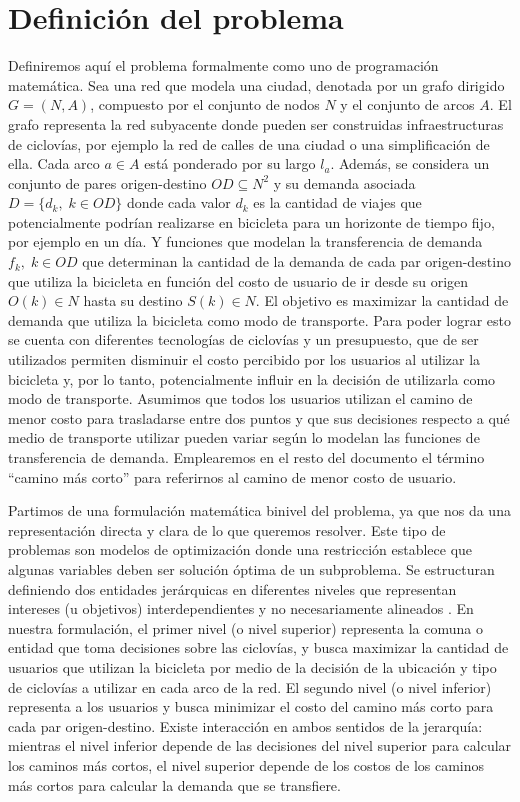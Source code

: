 \chapter{Definición del problema}
\label{sect:problemdefinition}

Definiremos aquí el problema formalmente como uno de programación matemática. Sea una red que modela una ciudad, denotada por un grafo dirigido $G=(N,A)$, compuesto por el conjunto de nodos $N$ y el conjunto de arcos $A$. El grafo representa la red subyacente donde pueden ser construidas infraestructuras de ciclovías, por ejemplo la red de calles de una ciudad o una simplificación de ella. Cada arco $a \in A$ está ponderado por su largo $l_a$. Además, se considera un conjunto de pares origen-destino $OD \subseteq N^2$ y su demanda asociada $D = \{d_k,\; k \in OD\}$ donde cada valor $d_k$ es la cantidad de viajes que potencialmente podrían realizarse en bicicleta para un horizonte de tiempo fijo, por ejemplo en un día. Y funciones que modelan la transferencia de demanda $f_k,\;k \in OD$ que determinan la cantidad de la demanda de cada par origen-destino que utiliza la bicicleta en función del costo de usuario de ir desde su origen $O(k) \in N$ hasta su destino $S(k) \in N$. El objetivo es maximizar la cantidad de demanda que utiliza la bicicleta como modo de transporte. Para poder lograr esto se cuenta con diferentes tecnologías de ciclovías y un presupuesto, que de ser utilizados permiten disminuir el costo percibido por los usuarios al utilizar la bicicleta y, por lo tanto, potencialmente influir en la decisión de utilizarla como modo de transporte. Asumimos que todos los usuarios utilizan el camino de menor costo para trasladarse entre dos puntos y que sus decisiones respecto a qué medio de transporte utilizar pueden variar según lo modelan las funciones de transferencia de demanda. Emplearemos en el resto del documento el término ``camino más corto'' para referirnos al camino de menor costo de usuario.

Partimos de una formulación matemática binivel del problema, ya que nos da una representación directa y clara de lo que queremos resolver. Este tipo de problemas son modelos de optimización donde una restricción establece que algunas variables deben ser solución óptima de un subproblema. Se estructuran definiendo dos entidades jerárquicas en diferentes niveles que representan intereses (u objetivos) interdependientes y no necesariamente alineados \parencite{bardbook}. En nuestra formulación, el primer nivel (o nivel superior) representa la comuna o entidad que toma decisiones sobre las ciclovías, y busca maximizar la cantidad de usuarios que utilizan la bicicleta por medio de la decisión de la ubicación y tipo de ciclovías a utilizar en cada arco de la red. El segundo nivel (o nivel inferior) representa a los usuarios y busca minimizar el costo del camino más corto para cada par origen-destino. Existe interacción en ambos sentidos de la jerarquía: mientras el nivel inferior depende de las decisiones del nivel superior para calcular los caminos más cortos, el nivel superior depende de los costos de los caminos más cortos para calcular la demanda que se transfiere.

